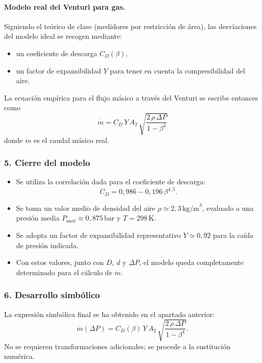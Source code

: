 \documentclass[12pt, a4paper]{article}
\begin{document}
\paragraph{Modelo real del Venturi para gas.}
Siguiendo el teórico de clase (medidores por restricción de área), las desviaciones del 
modelo ideal se recogen mediante:
\begin{itemize}
  \item un coeficiente de descarga $C_D(\beta)$,
  \item un factor de expansibilidad $Y$ para tener en cuenta la compresibilidad del aire.
\end{itemize}
La ecuación empírica para el flujo másico a través del Venturi se escribe entonces como
\[
\boxed{
\dot m = C_D\,Y\,A_2\,\sqrt{\frac{2\,\rho\,\Delta P}{1-\beta^4}}
}
\]
donde $\dot m$ es el caudal másico real.

\subsubsection*{5. Cierre del modelo}

\begin{itemize}
  \item Se utiliza la correlación dada para el coeficiente de descarga:
        \[
        C_D = 0{,}986 - 0{,}196\,\beta^{4{,}5}.
        \]
  \item Se toma un valor medio de densidad del aire 
        $\rho \simeq 2{,}3\,\text{kg/m}^3$, evaluado a una presión media 
        $P_\text{med} \approx 0{,}875\,\text{bar}$ y $T=298\,\text{K}$.
  \item Se adopta un factor de expansibilidad representativo 
        $Y \simeq 0{,}92$ para la caída de presión indicada.
  \item Con estos valores, junto con $D$, $d$ y $\Delta P$, el modelo queda completamente 
        determinado para el cálculo de $\dot m$.
\end{itemize}

\subsubsection*{6. Desarrollo simbólico}

La expresión simbólica final se ha obtenido en el apartado anterior:
\[
\dot m(\Delta P) 
= C_D(\beta)\,Y\,A_2\,
\sqrt{\frac{2\,\rho\,\Delta P}{1-\beta^4}}.
\]
No se requieren transformaciones adicionales; se procede a la sustitución numérica.
\end{document}
